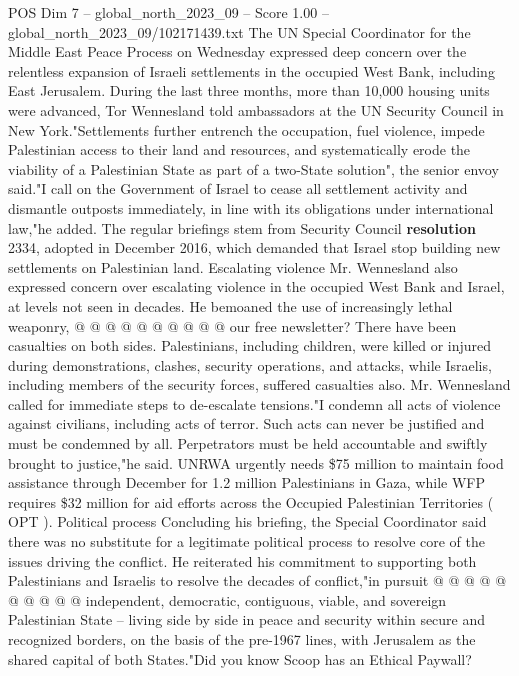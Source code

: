 \begin{textsample}{POS Dim 7 – global\_north\_2023\_09 – Score 1.00 – global\_north\_2023\_09/102171439.txt}  \label{ex:f7_pos_284}
The UN Special Coordinator for the Middle East Peace Process on Wednesday expressed deep concern over the relentless expansion of Israeli settlements in the occupied West Bank, including East Jerusalem.
During the last three months, more than 10,000 housing units were advanced, Tor Wennesland told ambassadors at the UN Security Council in New York."Settlements further entrench the occupation, fuel violence, impede Palestinian access to their land and resources, and systematically erode the viability of a Palestinian State as part of a two-State solution", the senior envoy said."I call on the Government of Israel to cease all settlement activity and dismantle outposts immediately, in line with its obligations under international law,"he added.
The regular briefings stem from Security Council \textbf{resolution} 2334, adopted in December 2016, which demanded that Israel stop building new settlements on Palestinian land.
Escalating violence Mr.
Wennesland also expressed concern over escalating violence in the occupied West Bank and Israel, at levels not seen in decades.
He bemoaned the use of increasingly lethal weaponry, @ @ @ @ @ @ @ @ @ @ our free newsletter?
There have been casualties on both sides.
Palestinians, including children, were killed or injured during demonstrations, clashes, security operations, and attacks, while Israelis, including members of the security forces, suffered casualties also.
Mr.
Wennesland called for immediate steps to de-escalate tensions."I condemn all acts of violence against civilians, including acts of terror.
Such acts can never be justified and must be condemned by all.
Perpetrators must be held accountable and swiftly brought to justice,"he said.
UNRWA urgently needs \$75 million to maintain food assistance through December for 1.2 million Palestinians in Gaza, while WFP requires \$32 million for aid efforts across the Occupied Palestinian Territories ( OPT ).
Political process Concluding his briefing, the Special Coordinator said there was no substitute for a legitimate political process to resolve core of the issues driving the conflict.
He reiterated his commitment to supporting both Palestinians and Israelis to resolve the decades of conflict,"in pursuit @ @ @ @ @ @ @ @ @ @ independent, democratic, contiguous, viable, and sovereign Palestinian State -- living side by side in peace and security within secure and recognized borders, on the basis of the pre-1967 lines, with Jerusalem as the shared capital of both States."Did you know Scoop has an Ethical Paywall?

\end{textsample}
